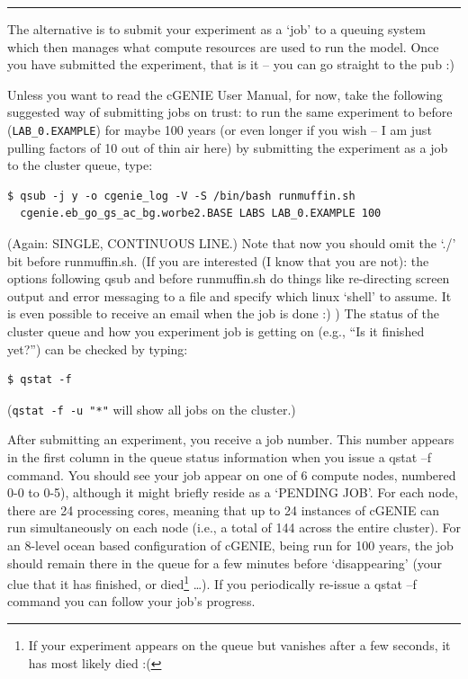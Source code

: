 \documentclass[11pt,fleqn]{book} %
\begin{document}
\vspace{1mm}
\noindent\rule{4cm}{0.1mm}
\vspace{2mm}

\noindent The alternative is to submit your experiment as a ‘job’ to a queuing system which then manages what compute resources are used to run the model. Once you have submitted the experiment, that is it – you can go straight to the pub :)

Unless you want to read the cGENIE User Manual, for now, take the following suggested way of submitting jobs on trust: to run the same experiment to before (\texttt{LAB\_0.EXAMPLE}) for maybe 100 years (or even longer if you wish – I am just pulling factors of 10 out of thin air here) by submitting the experiment as a job to the cluster queue, type:
\small\begin{verbatim}
$ qsub -j y -o cgenie_log -V -S /bin/bash runmuffin.sh
  cgenie.eb_go_gs_ac_bg.worbe2.BASE LABS LAB_0.EXAMPLE 100
\end{verbatim}\normalsize

(Again: SINGLE, CONTINUOUS LINE.)
Note that now you should omit the ‘./’ bit before runmuffin.sh.
(If you are interested (I know that you are not): the options following qsub and before runmuffin.sh do things like re-directing screen output and error messaging to a file and specify which linux ‘shell’ to assume. It is even possible to receive an email when the job is done :) )
The status of the cluster queue and how you experiment job is getting on (e.g., “Is it finished yet?”) can be checked by typing: 
\small\begin{verbatim}
$ qstat -f
\end{verbatim}\normalsize
(\texttt{qstat -f -u "*"} will show all jobs on the cluster.)

After submitting an experiment, you receive a job number. This number appears in the first column in the queue status information when you issue a qstat –f command. You should see your job appear on one of 6 compute nodes, numbered 0-0 to 0-5), although it might briefly reside as a ‘PENDING JOB’. For each node, there are 24 processing cores, meaning that up to 24 instances of cGENIE can run simultaneously on each node (i.e., a total of 144 across the entire cluster). For an 8-level ocean based configuration of cGENIE, being run for 100 years, the job should remain there in the queue for a few minutes before ‘disappearing’ (your clue that it has finished, or died\footnote{If your experiment appears on the queue but vanishes after a few seconds, it has most likely died :(} …). If you periodically re-issue a qstat –f command you can follow your job’s progress.
\end{document}
